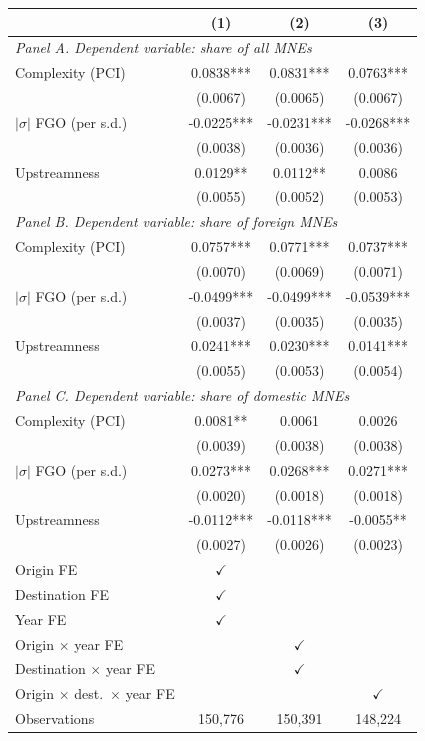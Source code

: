\begin{tabular}{lccc} \hline
 & (1) & (2) & (3) \\ \hline
\multicolumn{4}{l}{\textit{Panel A. Dependent variable: share of all MNEs}} \\
Complexity (PCI) & 0.0838*** & 0.0831*** & 0.0763*** \\
 & (0.0067) & (0.0065) & (0.0067) \\
$|\sigma|$ FGO (per s.d.) & -0.0225*** & -0.0231*** & -0.0268*** \\
 & (0.0038) & (0.0036) & (0.0036) \\
Upstreamness & 0.0129** & 0.0112** & 0.0086 \\
 & (0.0055) & (0.0052) & (0.0053) \\
\midrule
\multicolumn{4}{l}{\textit{Panel B. Dependent variable: share of foreign MNEs}} \\
Complexity (PCI) & 0.0757*** & 0.0771*** & 0.0737*** \\
 & (0.0070) & (0.0069) & (0.0071) \\
$|\sigma|$ FGO (per s.d.) & -0.0499*** & -0.0499*** & -0.0539*** \\
 & (0.0037) & (0.0035) & (0.0035) \\
Upstreamness & 0.0241*** & 0.0230*** & 0.0141*** \\
 & (0.0055) & (0.0053) & (0.0054) \\
\midrule
\multicolumn{4}{l}{\textit{Panel C. Dependent variable: share of domestic MNEs}} \\
Complexity (PCI) & 0.0081** & 0.0061 & 0.0026 \\
 & (0.0039) & (0.0038) & (0.0038) \\
$|\sigma|$ FGO (per s.d.) & 0.0273*** & 0.0268*** & 0.0271*** \\
 & (0.0020) & (0.0018) & (0.0018) \\
Upstreamness & -0.0112*** & -0.0118*** & -0.0055** \\
 & (0.0027) & (0.0026) & (0.0023) \\
\hline
Origin FE & $\checkmark$ &  &  \\
Destination FE & $\checkmark$ &  &  \\
Year FE & $\checkmark$ &  &  \\
Origin $\times$ year FE &  & $\checkmark$ &  \\
Destination $\times$ year FE &  & $\checkmark$ &  \\
Origin $\times$ dest.\ $\times$ year FE &  &  & $\checkmark$ \\
Observations & 150,776 & 150,391 & 148,224 \\
\hline
\end{tabular}
